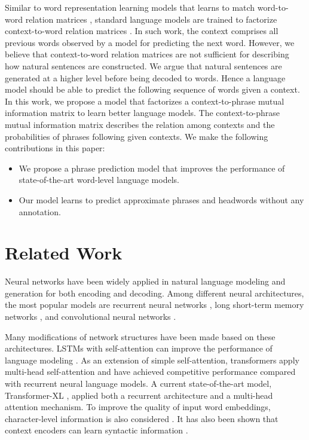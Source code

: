 \documentclass[11pt,a4paper]{article}
\begin{document}
Similar to word representation learning models that learns to match word-to-word relation matrices \cite{mikolov2013distributed,pennington2014glove}, standard language models are trained to factorize context-to-word relation matrices \cite{yang2017breaking}. In such work, the context comprises all previous words observed by a model for predicting the next word. However, we believe that context-to-word relation matrices are not sufficient for describing how natural sentences are constructed.
We argue that natural sentences are generated at a higher level before being decoded to words. Hence a language model should be able to predict the following sequence of words given a context. In this work, we propose a model that factorizes a context-to-phrase mutual information matrix to learn better language models. The context-to-phrase mutual information matrix describes the relation among contexts and the probabilities of phrases following given contexts. We make the following contributions in this paper:

\begin{itemize}
\item We propose a phrase prediction model that improves the performance of state-of-the-art word-level language models. 
\item Our model learns to predict approximate phrases and headwords without any annotation.
\end{itemize}

\section{Related Work}

Neural networks have been widely applied in natural language modeling and generation \cite{bengio2003neural,bahdanau2014neural} for both encoding and decoding. Among different neural architectures, the most popular models are recurrent neural networks  \citep[RNNs;][]{mikolov2010recurrent}, long short-term memory networks  \citep[LSTMs;][]{hochreiter1997long}, and convolutional neural networks  \cite[CNNs;][]{bai2018empirical,dauphin2017language}.

Many modifications of network structures have been made based on these architectures. LSTMs with self-attention can improve the performance of language modeling \cite{tran2016recurrent,cheng2016long}. As an extension of simple self-attention, transformers \cite{vaswani2017attention} apply multi-head self-attention and have achieved competitive performance compared with recurrent neural language models. A current state-of-the-art model, Transformer-XL \cite{dai2018transformer}, applied both a recurrent architecture and a multi-head attention mechanism. To improve the quality of input word embeddings, character-level information is also considered \cite{kim2016character}. It has also been shown that context encoders can learn syntactic information \cite{shen2017neural}.
\end{document}
